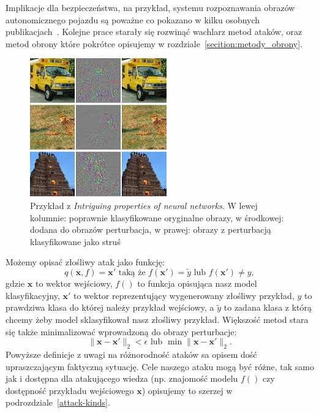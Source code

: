 \documentclass[
    left=2.5cm,         %
    right=2.5cm,        %
    top=2.5cm,          %
    bottom=3cm,         %
    bindingoffset=6mm,  %
    nohyphenation=false %
]{eiti/eiti-thesis}
\renewcommand{\vec}[1]{\mathbf{#1}}
\begin{document}
Implikacje dla bezpieczeństwa, na przykład, systemu rozpoznawania obrazów autonomicznego pojazdu są poważne co
pokazano w kilku osobnych publikacjach~\cite{DBLP:journals/corr/EvtimovEFKLPRS17,DBLP:journals/corr/abs-1907-00374, DBLP:journals/corr/abs-1801-02780}.
Kolejne prace starały się rozwinąć wachlarz metod ataków, oraz metod obrony\cite{DBLP:journals/corr/PapernotMWJS15, DBLP:journals/corr/abs-1801-08926, DBLP:journals/corr/abs-1904-00887} które pokrótce opisujemy w rozdziale~\ref{secition:metody_obrony}.
\begin{figure}[h]
    \begin{center}
        \includegraphics[width=0.75\linewidth]{eiti/adversarial_intriguing.jpg}
    \end{center}
    \caption{Przykład z \textit{Intriguing properties of neural networks}\cite{DBLP:journals/corr/SzegedyZSBEGF13}.
        W lewej kolumnie: poprawnie klasyfikowane oryginalne obrazy, w środkowej: dodana do obrazów perturbacja, w prawej: obrazy z perturbacją klasyfikowane jako struś}
    \label{intrguing_plot}
\end{figure}

Możemy opisać złośliwy atak jako funkcję:
\begin{equation}
    q(\vec{x}, f)=\vec{x'} \text{ taką że } f(\vec{x'})=\widetilde{y} \text{ lub } f(\vec{x'})\neq{y},
\end{equation}
gdzie $\vec{x}$ to wektor wejściowy, $f()$ to funkcja opisująca nasz model klasyfikacyjny, $\vec{x'}$ to wektor reprezentujący wygenerowany złośliwy przykład,
$y$ to prawdziwa klasa do której należy przykład wejściowy, a $\widetilde{y}$ to zadana klasa z którą chcemy żeby model sklasyfikował nasz złośliwy przykład.
Większość metod stara się także minimalizować wprowadzoną do obrazy perturbacje:
\begin{equation}
    \|\vec{x}-\vec{x'}\|_2 < \epsilon \text{  lub  } \min \|\vec{x}-\vec{x'}\|_2.
\end{equation}
Powyższe definicje z uwagi na różnorodność ataków sa opisem dość upraszczającym faktyczną sytuację.
Cele naszego ataku mogą być różne, tak samo jak i dostępna dla atakującego wiedza (np. znajomość modelu $f()$ czy dostępność przykładu wejściowego $\vec{x}$) opisujemy to szerzej w podrozdziale~\ref{attack-kinds}.
\end{document}
